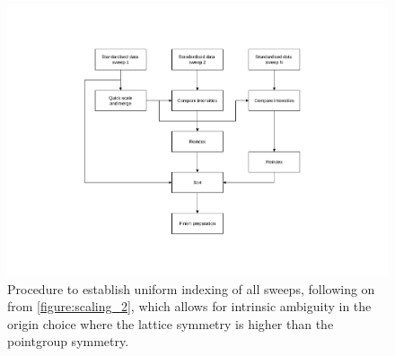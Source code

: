 \documentclass[preprint,pdf]{iucr}
\begin{document}
\begin{figure}
\caption{Procedure to establish uniform indexing of all sweeps,
following on from \ref{figure:scaling_2}, which allows for intrinsic
ambiguity in the origin choice where the lattice symmetry is higher
than the pointgroup symmetry.
\label{figure:scaling_3}}
\centering
\includegraphics[scale=0.5]{figures/scaling-step-3.pdf}
\end{figure}
\end{document}
